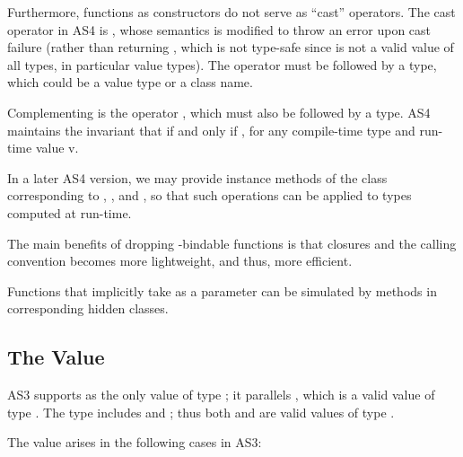 Furthermore, functions as constructors do not serve as ``cast''
operators. The cast operator in AS4 is , whose semantics is
modified to throw an error upon cast failure (rather than returning
, which is not type-safe since  is not a valid
value of all types, in particular value types). The  operator
must be followed by a type, which could be a value type or a class
name.

Complementing  is the operator , which must also be
followed by a type. AS4 maintains the invariant that  if
and only if , for any compile-time type 
and run-time value {v}.

In a later AS4 version, we may provide instance methods of
the  class corresponding to , , and , so
that such operations can be applied to types computed at run-time.

The main benefits of dropping -bindable functions is that
closures and the calling convention becomes more lightweight, and
thus, more efficient.

Functions that implicitly take  as a parameter can be
simulated by methods in corresponding hidden classes.

\subsection{The  Value}

AS3 supports  as the only value of type
; it parallels , which is a valid value of type
. The type \code{*} includes  and
; thus both  and  are valid values of type \code{*}.

The value  arises in the following cases in AS3:

